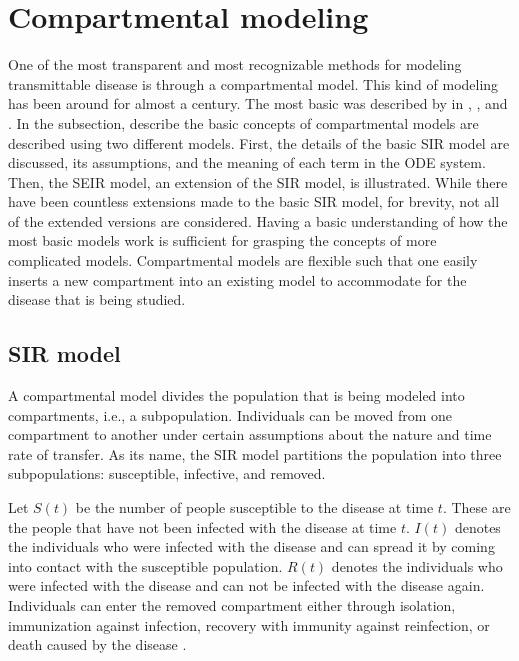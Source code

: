 \section{Compartmental modeling}
\label{sec:literature-review-compartmental-modeling}

One of the most transparent and most recognizable methods for modeling transmittable disease is through a compartmental model.
This kind of modeling has been around for almost a century.
The most basic was described by \citeauthor{kermackContributionMathematicalTheory1927} \cite{kermackContributionMathematicalTheory1927, kermackContributionsMathematicalTheory1932, kermackContributionsMathematicalTheory1933} in \citeyear{kermackContributionMathematicalTheory1927}, \citeyear{kermackContributionsMathematicalTheory1932}, and \citeyear{ kermackContributionsMathematicalTheory1933}.
In the subsection, describe the basic concepts of compartmental models are described using two different models.
First, the details of the basic \gls{SIR} model are discussed, its assumptions, and the meaning of each term in the \gls{ODE} system.
Then, the SEIR model, an extension of the \gls{SIR} model, is illustrated.
While there have been countless extensions made to the basic \gls{SIR} model, for brevity, not all of the extended versions are considered.
Having a basic understanding of how the most basic models work is sufficient for grasping the concepts of more complicated models.
Compartmental models are flexible such that one easily inserts a new compartment into an existing model to accommodate for the disease that is being studied.

\subsection{SIR model}

A compartmental model divides the population that is being modeled into compartments, i.e., a subpopulation.
Individuals can be moved from one compartment to another under certain assumptions about the nature and time rate of transfer.
As its name, the \gls{SIR} model partitions the population into three subpopulations: susceptible, infective, and removed.

Let $S(t)$ be the number of people susceptible to the disease at time $t$.
These are the people that have not been infected with the disease at time $t$.
$I(t)$ denotes the individuals who were infected with the disease and can spread it by coming into contact with the susceptible population.
$R(t)$ denotes the individuals who were infected with the disease and can not be infected with the disease again.
Individuals can enter the removed compartment either through isolation, immunization against infection, recovery with immunity against reinfection, or death caused by the disease \cite{brauerCompartmentalModelsEpidemiology2008}.

